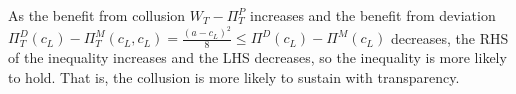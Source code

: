\documentclass[12pt]{article}
\begin{document}
As the benefit from collusion $W_T-\Pi^P_T$ increases and the benefit from deviation $\Pi^D_T(c_L)-\Pi^M_T(c_L,c_L)=\frac{(a-c_L)^2}{8}\leq\Pi^D(c_L)-\Pi^M(c_L)$ decreases, the RHS of the inequality increases and the LHS decreases, so the inequality is more likely to hold. That is, the collusion is more likely to sustain with transparency.
\end{document}
